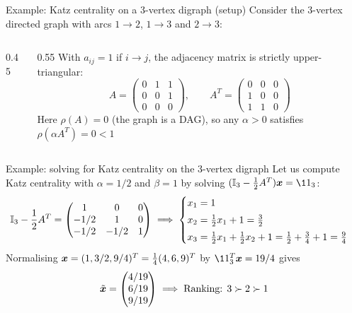 \documentclass[aspectratio=169]{beamer}\usepackage[]{graphicx}\usepackage[]{xcolor}
\begin{document}
\begin{frame}{Example: Katz centrality on a 3-vertex digraph (setup)}
Consider the 3-vertex directed graph with arcs $1 \to 2$, $1 \to 3$ and $2 \to 3$:
\vfill
\begin{columns}[c]
\begin{column}{0.45\textwidth}
\centering
{}
\end{column}
\begin{column}{0.55\textwidth}
With $a_{ij} = 1$ if $i \to j$, the adjacency matrix is strictly upper-triangular:
\[
A = \begin{pmatrix}
0 & 1 & 1 \\
0 & 0 & 1 \\
0 & 0 & 0
\end{pmatrix},
\qquad
A^T = \begin{pmatrix}
0 & 0 & 0 \\
1 & 0 & 0 \\
1 & 1 & 0
\end{pmatrix}
\]
Here $\rho(A) = 0$ (the graph is a DAG), so any $\alpha > 0$ satisfies $\rho(\alpha A^T) = 0 < 1$
\end{column}
\end{columns}
\end{frame}

\begin{frame}{Example: solving for Katz centrality on the 3-vertex digraph}
Let us compute Katz centrality with $\alpha = 1/2$ and $\beta = 1$ by solving $(\II_3 - \frac{1}{2}A^T)\bx = \11_3$:
\vfill
\[
\mathbb{I}_3 - \frac{1}{2}A^T = \begin{pmatrix}
1 & 0 & 0 \\
-1/2 & 1 & 0 \\
-1/2 & -1/2 & 1
\end{pmatrix}
\implies
\begin{cases}
x_1 = 1 \\[3pt]
x_2 = \frac{1}{2}x_1 + 1 = \frac{3}{2} \\[3pt]
x_3 = \frac{1}{2}x_1 + \frac{1}{2}x_2 + 1 = \frac{1}{2} + \frac{3}{4} + 1 = \frac{9}{4}
\end{cases}
\]
\vfill
Normalising $\bm{x} = (1, 3/2, 9/4)^T = \frac{1}{4}(4, 6, 9)^T$ by $\11_3^T \bx = 19/4$ gives
\[
\tilde{\bm{x}} = \begin{pmatrix} 4/19 \\ 6/19 \\ 9/19 \end{pmatrix} \implies \text{Ranking: } 3 \succ 2 \succ 1
\]
\end{frame}
\end{document}
